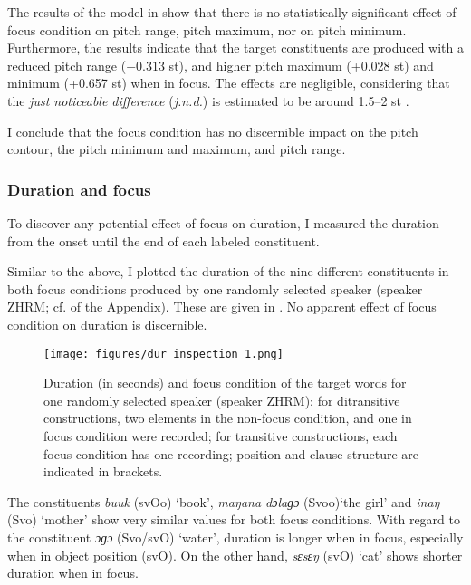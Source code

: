 The results of the model in   show that there is no statistically significant effect of focus condition on pitch range, pitch maximum, nor on pitch minimum. Furthermore, the results indicate that the target constituents are produced with a reduced pitch range ($-0.313$ st), and higher pitch maximum (+0.028 st) and minimum (+0.657 st) when in focus.  The effects  are negligible, considering that the \textit{just noticeable difference} (\textit{j.n.d.})  is estimated to be around 1.5--2 st \citep[29]{_t_Hart_1981,Hart_1990}. 

I conclude that the focus condition has no discernible impact on the pitch contour, the pitch minimum and maximum, and pitch range.


\subsubsection{Duration and focus}
\label{sec:duration-and-focus}

To discover any potential effect of focus on duration, I measured the duration from the onset until the end of each labeled constituent.

Similar to the above, I plotted the duration of the nine different constituents in both focus conditions  produced by one randomly selected speaker (speaker ZHRM; cf.   of the Appendix). These are given in  . No apparent effect of focus condition on duration is discernible.



\begin{figure}
	\texttt{[image: figures/dur\_inspection\_1.png]}
	\caption{Duration (in seconds) and focus condition of the target words for one randomly selected speaker (speaker ZHRM): for ditransitive constructions, two elements in the non-focus condition, and one in focus condition were recorded; for transitive constructions, each focus condition has one recording; position and clause structure are indicated in brackets.}
	\label{dur inspection_1_speaker}
\end{figure}

The constituents \textit{bu​uk} (svOo) ‘book’, \textit{maŋana dɔlaɡɔ} (Svoo)‘the girl’ and \textit{inaŋ} (Svo) ‘mother’ show very similar values for both focus conditions. With regard to the constituent \textit{ɔɡɔ} (Svo/svO) ‘water’, duration is longer when in focus, especially when in object position (svO). On the other hand, \textit{sɛsɛŋ} (svO) ‘cat’ shows shorter duration when in focus.

